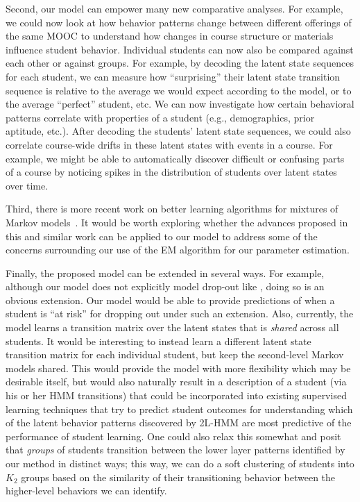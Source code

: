 Second, our model can empower many new comparative analyses. For example,
we could now look at how behavior patterns change between different
offerings of the same MOOC to understand how changes in course structure or
materials influence student behavior. Individual students can now also be
compared against each other or against groups. For example, by decoding the
latent state sequences for each student, we can measure how ``surprising''
their latent state transition sequence is relative to the average we would
expect according to the model, or to the average ``perfect'' student, etc.
We can now investigate how certain behavioral patterns correlate with
properties of a student (e.g., demographics, prior aptitude, etc.). After
decoding the students' latent state sequences, we could also correlate
course-wide drifts in these latent states with events in a course. For
example, we might be able to automatically discover difficult or confusing
parts of a course by noticing spikes in the distribution of students over
latent states over time.

Third, there is more recent work on better learning algorithms for mixtures of
Markov models~\citep{Gupta:2016:NIPS}. It would be worth exploring whether
the advances proposed in this and similar work can be applied to our model
to address some of the concerns surrounding our use of the EM algorithm for
our parameter estimation.

Finally, the proposed model can be extended in several ways. For example,
although our model does not explicitly model drop-out like
\citet{Kizilcec:2013:LAK}, doing so is an obvious extension. Our model
would be able to provide predictions of when a student is ``at risk'' for
dropping out under such an extension. Also, currently, the model learns a
transition matrix over the latent states that is \emph{shared} across all
students. It would be interesting to instead learn a different latent state
transition matrix for each individual student, but keep the second-level
Markov models shared. This would provide the model with more flexibility
which may be desirable itself, but would also naturally result in a
description of a student (via his or her HMM transitions) that could be
incorporated into existing supervised learning techniques that try to
predict student outcomes for understanding which of the latent behavior
patterns discovered by 2L-HMM are most predictive of the performance of
student learning. One could also relax this somewhat and posit that
\emph{groups} of students transition between the lower layer patterns
identified by our method in distinct ways; this way, we can do a soft
clustering of students into $K_2$ groups based on the similarity of their
transitioning behavior between the higher-level behaviors we can identify.


